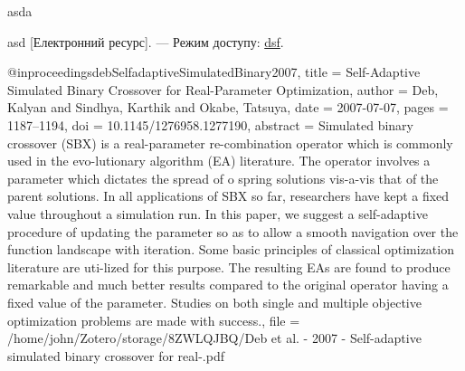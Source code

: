 \begin{thebibliography}    
    asda

    asd [Електронний ресурс]. --- Режим доступу: \url{dsf}.

@inproceedings{debSelfadaptiveSimulatedBinary2007,
  title = {Self-Adaptive Simulated Binary Crossover for Real-Parameter Optimization},
  author = {Deb, Kalyan and Sindhya, Karthik and Okabe, Tatsuya},
  date = {2007-07-07},
  pages = {1187--1194},
  doi = {10.1145/1276958.1277190},
  abstract = {Simulated binary crossover (SBX) is a real-parameter re-combination operator which is commonly used in the evo-lutionary algorithm (EA) literature. The operator involves a parameter which dictates the spread of o spring solutions vis-a-vis that of the parent solutions. In all applications of SBX so far, researchers have kept a fixed value throughout a simulation run. In this paper, we suggest a self-adaptive procedure of updating the parameter so as to allow a smooth navigation over the function landscape with iteration. Some basic principles of classical optimization literature are uti-lized for this purpose. The resulting EAs are found to produce remarkable and much better results compared to the original operator having a fixed value of the parameter. Studies on both single and multiple objective optimization problems are made with success.},
  file = {/home/john/Zotero/storage/8ZWLQJBQ/Deb et al. - 2007 - Self-adaptive simulated binary crossover for real-.pdf}
}


\end{thebibliography}

